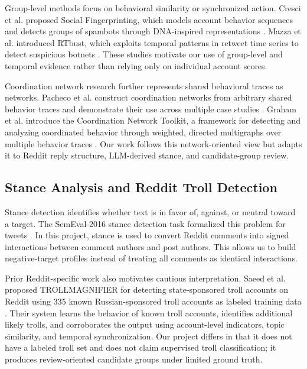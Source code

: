 \documentclass[conference]{IEEEtran}
\begin{document}
Group-level methods focus on behavioral similarity or synchronized action.
Cresci et al. proposed Social Fingerprinting, which models account behavior
sequences and detects groups of spambots through DNA-inspired representations
\cite{cresci2018social}. Mazza et al. introduced RTbust, which exploits
temporal patterns in retweet time series to detect suspicious botnets
\cite{mazza2019rtbust}. These studies motivate our use of group-level and
temporal evidence rather than relying only on individual account scores.

Coordination network research further represents shared behavioral traces as
networks. Pacheco et al. construct coordination networks from arbitrary shared
behavior traces and demonstrate their use across multiple case studies
\cite{pacheco2021uncovering}. Graham et al. introduce the Coordination Network
Toolkit, a framework for detecting and analyzing coordinated behavior through
weighted, directed multigraphs over multiple behavior traces
\cite{graham2024coordination}. Our work follows this network-oriented view but
adapts it to Reddit reply structure, LLM-derived stance, and candidate-group
review.

\subsection{Stance Analysis and Reddit Troll Detection}

Stance detection identifies whether text is in favor of, against, or neutral
toward a target. The SemEval-2016 stance detection task formalized this
problem for tweets \cite{mohammad2016semeval}. In this project, stance is
used to convert Reddit comments into signed interactions between comment
authors and post authors. This allows us to build negative-target profiles
instead of treating all comments as identical interactions.

Prior Reddit-specific work also motivates cautious interpretation. Saeed et
al. proposed TROLLMAGNIFIER for detecting state-sponsored troll accounts on
Reddit using 335 known Russian-sponsored troll accounts as labeled training
data \cite{saeed2022trollmagnifier}. Their system learns the behavior of known
troll accounts, identifies additional likely trolls, and corroborates the
output using account-level indicators, topic similarity, and temporal
synchronization. Our project differs in that it does not have a labeled troll
set and does not claim supervised troll classification; it produces
review-oriented candidate groups under limited ground truth.
\end{document}
